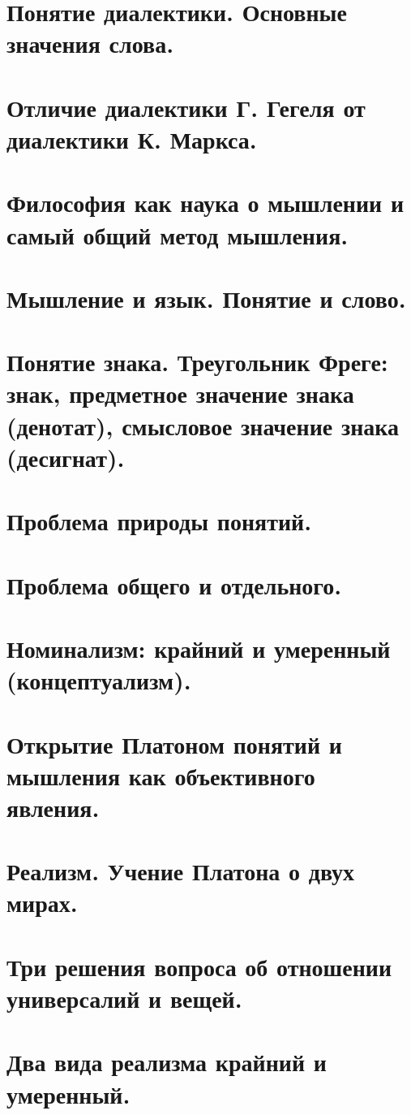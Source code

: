 \section{ Понятие диалектики. Основные значения слова.}
\section{ Отличие диалектики Г. Гегеля от диалектики К. Маркса.}
\section{ Философия как наука о мышлении и самый общий метод мышления.}
\section{ Мышление и язык. Понятие и слово.}
\section{ Понятие знака. Треугольник Фреге: знак, предметное значение знака (денотат), смысловое значение знака (десигнат).}
\section{ Проблема природы понятий.}
\section{ Проблема общего и отдельного.}
\section{ Номинализм: крайний и умеренный (концептуализм).}
\section{ Открытие Платоном понятий и мышления как объективного явления.}
\section{ Реализм. Учение Платона о двух мирах.}
\section{ Три решения вопроса об отношении универсалий и вещей.}
\section{ Два вида реализма крайний и умеренный.}
